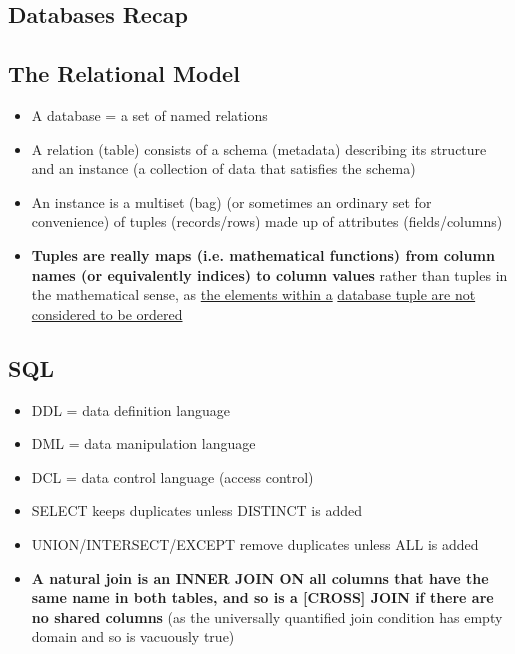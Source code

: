 \documentclass[20pt,a4paper,landscape]{extarticle}
\begin{document}
\tableofcontents
\clearpage
\begin{flushleft}
\section{Databases Recap}
\subsection{The Relational Model}
\begin{itemize}
\item A database = a set of named relations
\item A relation (table) consists of a schema (metadata) describing its structure and an instance (a collection of data that satisfies the schema)
\item An instance is a multiset (bag) (or sometimes an ordinary set for convenience) of tuples (records/rows) made up of attributes (fields/columns)
\item \textbf{Tuples are really maps (i.e. mathematical functions) from column names (or equivalently indices) to column values} rather than tuples in the mathematical sense, as \underline{the elements within a} \underline{database tuple are not considered to be ordered}
\end{itemize}
\subsection{SQL}
\begin{itemize}
\item DDL = data definition language
\item DML = data manipulation language
\item DCL = data control language (access control)
\item SELECT keeps duplicates unless DISTINCT is added
\item UNION/INTERSECT/EXCEPT remove duplicates unless ALL is added
\item \textbf{A natural join is an INNER JOIN ON all columns that have the same name in both tables, and so is a [CROSS] JOIN if there are no shared columns} (as the universally quantified join condition has empty domain and so is vacuously true)
\end{itemize}

\end{flushleft}
\end{document}
